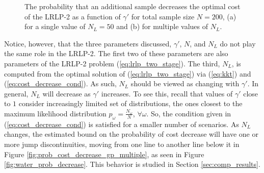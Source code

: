 \documentclass[11pt]{article}
\begin{document}
\begin{figure}
	\centering
	\caption{The probability that an additional sample decreases the optimal cost of the LRLP-2 as a function of $\gamma'$ for total sample size $N = 200$, (a) for a single value of $N_L = 50$ and (b) for multiple values of $N_L$.}
\end{figure}

Notice, however, that the three parameters discussed, $\gamma'$, $N$, and $N_L$ do not play the same role in the LRLP-2.
The first two of these parameters are also parameters of the LRLP-2 problem (\ref{eq:lrlp_two_stage}).
The third, $N_L$, is computed from the optimal solution of (\ref{eq:lrlp_two_stage}) via (\ref{eq:kkt}) and (\ref{eq:cost_decrease_cond}).
As such, $N_L$ should be viewed as changing with $\gamma'$.
In general, $N_L$ will decrease as $\gamma'$ increases. To see this, recall that values of  $\gamma'$ close to $1$ consider increasingly limited set of distributions, the ones closest to the maximum likelihood distribution $p_\omega = \frac{N_\omega}{N}$, $\forall \omega$. So, the condition given in (\ref{eq:cost_decrease_cond}) is satisfied for a smaller number of scenarios. As $N_L$ changes, the estimated bound on the probability of cost decrease will have one or more jump discontinuities, moving from one line to another line below it in Figure \ref{fig:prob_cost_decrease_gp_multiple}, as seen in Figure \ref{fig:water_prob_decrease}.
This behavior is studied in Section \ref{sec:comp_results}.
\end{document}

